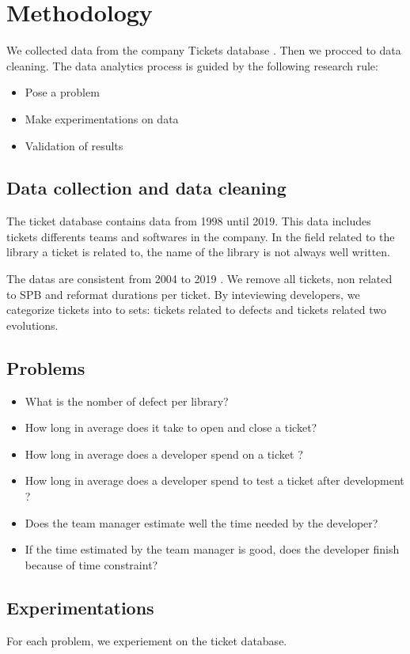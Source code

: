 \documentclass[10pt,conference]{IEEEtran}
\begin{document}
\section{Methodology}\label{sec:methodology}
We collected data  from the company Tickets database .  Then we procced to data cleaning.
The data analytics process is guided by the following research rule:
\begin{itemize}
\item Pose a problem
\item Make experimentations on data
\item Validation of results
\end{itemize}
\subsection{Data collection and data cleaning}
The ticket database contains data from 1998  until 2019.  This data includes tickets  differents teams and softwares in  the company. In the field related to the  library a ticket is related to,  the name of the library is not always well written. 

  The  datas are consistent  from 2004 to 2019 . We  remove all tickets, non related  to SPB and reformat durations per ticket. By inteviewing developers, we categorize tickets into to sets: tickets related to defects and tickets related two evolutions.

 \subsection{Problems}
 \begin{itemize}
 \item What is the nomber of defect per library?
 \item How long in average does it take to open and close a ticket?
 \item How long in average  does a developer spend on a ticket ?
 \item How long in average does a developer spend to test a ticket after development ?
 \item Does the team manager estimate well  the time needed by the developer?
 \item If the time estimated by the team manager is good, does the developer finish because  of time constraint?
 \end{itemize}
 
 \subsection{Experimentations}
For each problem, we experiement on the ticket database. 
\end{document}
